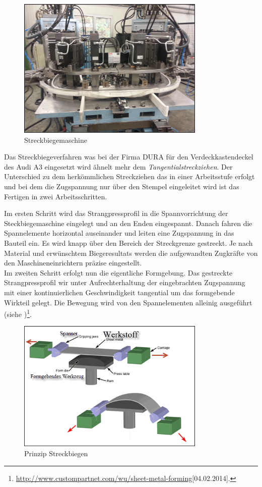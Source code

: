 \documentclass[12pt,a4paper,parskip]{scrartcl}
\begin{document}
\begin{figure}[hbtp]
\centering
\includegraphics[width=0.8\textwidth]{Streckbiegemaschine}
\caption{Streckbiegemaschine}
\label{fig:Streckbiegemaschine}
\end{figure}
Das Streckbiegeverfahren was bei der Firma DURA  für den Verdeckkastendeckel des Audi A3 eingesetzt wird ähnelt mehr dem \emph{Tangentialstreckziehen}. Der Unterschied zu dem herkömmlichen Streckziehen das in einer Arbeitsstufe erfolgt und bei dem die Zugspannung nur über den Stempel eingeleitet wird ist das Fertigen in zwei Arbeitsschritten.

 Im ersten Schritt wird das Strangpressprofil in die Spannvorrichtung der Steckbiegemaschine eingelegt und an den Enden eingespannt. Danach fahren die Spannelemente horizontal auseinander und leiten eine Zugspannung in das Bauteil ein. Es wird knapp über den Bereich der Streckgrenze gestreckt. Je nach Material und erwünschtem Biegeresultats werden die aufgewandten Zugkräfte von den Maschineneinrichtern präzise eingestellt.\\
  Im zweiten Schritt erfolgt nun die eigentliche Formgebung. Das gestreckte Strangpressprofil wir unter Aufrechterhaltung der eingebrachten Zugspannung mit einer kontinuierlichen Geschwindigkeit tangential um das formgebende Wirkteil gelegt. Die Bewegung wird von den Spannelementen alleinig ausgeführt (siehe )\footnote{\url{http://www.custompartnet.com/wu/sheet-metal-forming}[04.02.2014].}. 
  \begin{figure}[hbtp]
  \centering
  \includegraphics[width=0.8\textwidth]{streckbiegen}
  \caption{Prinzip Streckbiegen}
  \label{fig:streckbiegen} 
  \end{figure}
  
\end{document}
